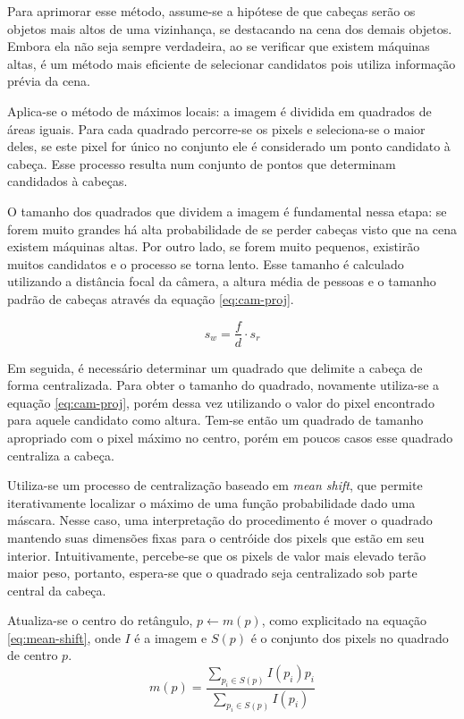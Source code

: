 Para aprimorar esse método, assume-se a hipótese de que cabeças serão os objetos mais altos de uma vizinhança, se destacando na cena dos demais objetos. Embora ela não seja sempre verdadeira, ao se verificar que existem máquinas altas, é um método mais eficiente de selecionar candidatos pois utiliza informação prévia da cena.

Aplica-se o método de máximos locais: a imagem é dividida em quadrados de áreas iguais. Para cada quadrado percorre-se os pixels e seleciona-se o maior deles, se este pixel for único no conjunto ele é considerado um ponto candidato à cabeça. Esse processo resulta num conjunto de pontos que determinam candidados à cabeças.

O tamanho dos quadrados que dividem a imagem é fundamental nessa etapa: se forem muito grandes há alta probabilidade de se perder cabeças visto que na cena existem máquinas altas. Por outro lado, se forem muito pequenos, existirão muitos candidatos e o processo se torna lento. Esse tamanho é calculado utilizando a distância focal da câmera, a altura média de pessoas e o tamanho padrão de cabeças através da equação \ref{eq:cam-proj}.

\begin{equation}
	\label{eq:cam-proj}
	s_w = \frac{f}{d} \cdot s_r
\end{equation}

Em seguida, é necessário determinar um quadrado que delimite a cabeça de forma centralizada. Para obter o tamanho do quadrado, novamente utiliza-se a equação \ref{eq:cam-proj}, porém dessa vez utilizando o valor do pixel encontrado para aquele candidato como altura. Tem-se então um quadrado de tamanho apropriado com o pixel máximo no centro, porém em poucos casos esse quadrado centraliza a cabeça.

Utiliza-se um processo de centralização baseado em \textit{mean shift}, que permite iterativamente localizar o máximo de uma função probabilidade dado uma máscara. Nesse caso, uma interpretação do procedimento é mover o quadrado mantendo suas dimensões fixas para o centróide dos pixels que estão em seu interior. Intuitivamente, percebe-se que os pixels de valor mais elevado terão maior peso, portanto, espera-se que o quadrado seja centralizado sob parte central da cabeça.

Atualiza-se o centro do retângulo, $p \gets m(p)$, como explicitado na equação \ref{eq:mean-shift}, onde $I$ é a imagem e $S(p)$ é o conjunto dos pixels no quadrado de centro $p$.
\begin{equation}
	\label{eq:mean-shift}
	m(p) = \frac{\sum_{p_i \in S(p)} I(p_i)p_i}{\sum_{p_i \in S(p)} I(p_i)}
\end{equation}

